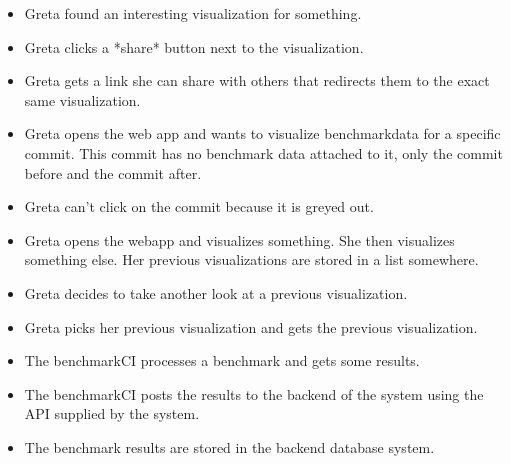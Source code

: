 \begin{itemize}
	\item Greta found an interesting visualization for something.
	\item Greta clicks a *share* button next to the visualization.
	\item Greta gets a link she can share with others that redirects them to the exact same visualization.
\end{itemize}

\begin{itemize}
	\item Greta opens the web app and wants to visualize benchmarkdata for a specific commit. This commit has no benchmark data attached to it, only the commit before and the commit after.
	\item Greta can't click on the commit because it is greyed out.
\end{itemize}

\begin{itemize}
	\item Greta opens the webapp and visualizes something. She then visualizes something else. Her previous visualizations are stored in a list somewhere.
	\item Greta decides to take another look at a previous visualization.
	\item Greta picks her previous visualization and gets the previous visualization.
\end{itemize}

\begin{itemize}
	\item The benchmarkCI processes a benchmark and gets some results.
	\item The benchmarkCI posts the results to the backend of the system using the API supplied by the system.
	\item The benchmark results are stored in the backend database system.
\end{itemize}